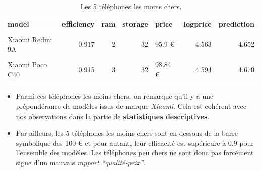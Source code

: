 \documentclass[
  12pt,
]{report}
\begin{document}
\begin{table}[!h]

\caption{\label{tab:kbl_expensive}Les 5 téléphones les moins chers.}
\centering
\begin{tabular}[t]{lrrrlrr}
\toprule
\textbf{model} & \textbf{efficiency} & \textbf{ram} & \textbf{storage} & \textbf{price} & \textbf{logprice} & \textbf{prediction}\\
\midrule
\cellcolor{gray!6}{Xiaomi Redmi A1} & \cellcolor{gray!6}{0.918} & \cellcolor{gray!6}{2} & \cellcolor{gray!6}{32} & \cellcolor{gray!6}{91.4 €} & \cellcolor{gray!6}{4.515} & \cellcolor{gray!6}{4.613}\\
Xiaomi Redmi 9A & 0.917 & 2 & 32 & 95.9 € & 4.563 & 4.652\\
\cellcolor{gray!6}{Xiaomi Redmi 9AT} & \cellcolor{gray!6}{0.932} & \cellcolor{gray!6}{2} & \cellcolor{gray!6}{32} & \cellcolor{gray!6}{96.91 €} & \cellcolor{gray!6}{4.574} & \cellcolor{gray!6}{4.776}\\
Xiaomi Poco C40 & 0.915 & 3 & 32 & 98.84 € & 4.594 & 4.670\\
\cellcolor{gray!6}{Motorola E13} & \cellcolor{gray!6}{0.914} & \cellcolor{gray!6}{2} & \cellcolor{gray!6}{64} & \cellcolor{gray!6}{99 €} & \cellcolor{gray!6}{4.595} & \cellcolor{gray!6}{4.664}\\
\bottomrule
\end{tabular}
\end{table}

\begin{itemize}
\item
  Parmi ces téléphones les moins chers, on remarque qu'il y a une
  prépondérance de modèles issus de marque \emph{Xiaomi}. Cela est
  cohérent avec nos observations dans la partie de \textbf{statistiques
  descriptives}.
\item
  Par ailleurs, les 5 téléphones les moins chers sont en dessous de la
  barre symbolique des 100 € et pour autant, leur efficacité est
  supérieure à \(0.9\) pour l'ensemble des modèles. Les téléphones peu
  chers ne sont donc pas forcément signe d'un mauvais \emph{rapport
  ``qualité-prix''}.
\end{itemize}
\end{document}
